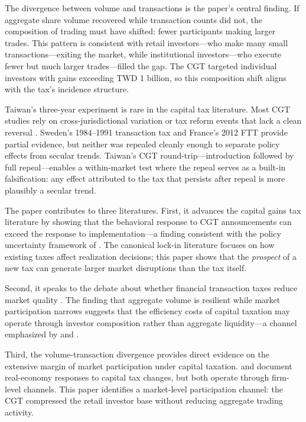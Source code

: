\documentclass[12pt]{article}
\begin{document}
The divergence between volume and transactions is the paper's central finding. If aggregate share volume recovered while transaction counts did not, the composition of trading must have shifted: fewer participants making larger trades. This pattern is consistent with retail investors---who make many small transactions---exiting the market, while institutional investors---who execute fewer but much larger trades---filled the gap. The CGT targeted individual investors with gains exceeding TWD 1 billion, so this composition shift aligns with the tax's incidence structure.

Taiwan's three-year experiment is rare in the capital tax literature. Most CGT studies rely on cross-jurisdictional variation \citep{poterba2002taxation, auerbach1989capital} or tax reform events that lack a clean reversal \citep{sialm2009tax, yagan2015capital}. Sweden's 1984--1991 transaction tax \citep{umlauf1993transaction} and France's 2012 FTT \citep{colliard2012financial, pomeranets2017stock} provide partial evidence, but neither was repealed cleanly enough to separate policy effects from secular trends. Taiwan's CGT round-trip---introduction followed by full repeal---enables a within-market test where the repeal serves as a built-in falsification: any effect attributed to the tax that persists after repeal is more plausibly a secular trend.

The paper contributes to three literatures. First, it advances the capital gains tax literature by showing that the behavioral response to CGT announcements can exceed the response to implementation---a finding consistent with the policy uncertainty framework of \citet{baker2016measuring}. The canonical lock-in literature \citep{feldstein1980effects, burman1994measuring, dai2008capital, jin2006capital} focuses on how existing taxes affect realization decisions; this paper shows that the \emph{prospect} of a new tax can generate larger market disruptions than the tax itself.

Second, it speaks to the debate about whether financial transaction taxes reduce market quality \citep{stiglitz1989using, summers1989when, tobin1978proposal, habermeier2003securities, jones1997transactions}. The finding that aggregate volume is resilient while market participation narrows suggests that the efficiency costs of capital taxation may operate through investor composition rather than aggregate liquidity---a channel emphasized by \citet{delong1990noise} and \citet{amihud2002illiquidity}.

Third, the volume-transaction divergence provides direct evidence on the extensive margin of market participation under capital taxation. \citet{chetty2005dividend} and \citet{yagan2015capital} document real-economy responses to capital tax changes, but both operate through firm-level channels. This paper identifies a market-level participation channel: the CGT compressed the retail investor base without reducing aggregate trading activity.
\end{document}
